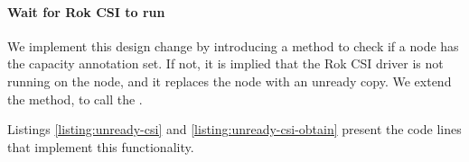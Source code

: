 


\paragraph*{Wait for Rok CSI to run}

We implement this design change by introducing a
 method to check if a node has the capacity
annotation set. If not, it is implied that the Rok CSI driver is not running on
the node, and it replaces the node with an unready copy. We extend the
 method, to call the .

Listings \ref{listing:unready-csi} and \ref{listing:unready-csi-obtain} present
the code lines that implement this functionality.



